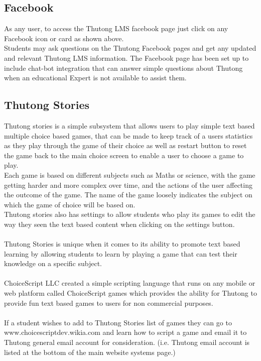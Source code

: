 \documentclass[english]{article}
\begin{document}
\subsection{Facebook}

As any user, to access the Thutong LMS facebook page just click on any Facebook icon or card as shown above. \\
Students may ask questions on the Thutong Facebook pages and get any updated and relevant Thutong LMS information.
The Facebook page has been set up to include chat-bot integration that can answer simple questions about Thutong when an educational Expert is not available to assist them.

\subsection{Thutong Stories}

Thutong stories is a simple subsystem that allows users to play simple text based multiple choice based games, that can be made to keep track of a users statistics as they play through the game of their choice as well as restart button to reset the game back to the main choice screen to enable a user to choose a game to play. \\
Each game is based on different subjects such as Maths or science, with the game getting harder and more complex over time, and the actions of the user affecting the outcome of the game. The name of the game loosely indicates the subject on which the game of choice will be based on. \\
Thutong stories also has settings to allow students who play its games to edit the way they seen the text based content when clicking on the settings button. \\\\ Thutong Stories is unique when it comes to its ability to promote text based learning by allowing students to learn by playing a game that can test their knowledge on a specific subject. 
\\\\
ChoiceScript LLC created a simple scripting language that runs on any mobile or web platform called ChoiceScript games which provides the ability for Thutong to provide fun text based games to users for non commercial purposes.
\\\\
If a student wishes to add to Thutong Stories list of games they can go to www.choicescriptdev.wikia.com and learn how to script a game and email it to Thutong general email account for consideration. (i.e. Thutong email account is listed at the bottom of the main website systems page.)
\end{document}
